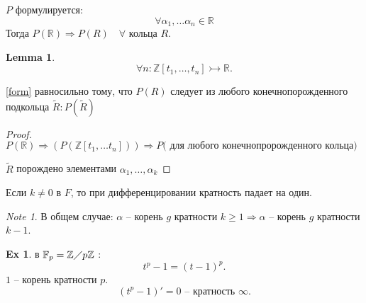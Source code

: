\documentclass[11pt]{book}
\newcommand{\Z}{\mathbb{Z}}
\newcommand{\R}{\mathbb{R}}
\theoremstyle{definition}
\theoremstyle{plain}
\theoremstyle{plain}
\newtheorem*{lm}{Lemma}
\theoremstyle{definition}
\newtheorem*{ex}{Ex}
\theoremstyle{remark}
\newtheorem*{note}{Note}
\begin{document}
$ P$ формулируется:
\begin{equation}\label{form}
\forall  \alpha _1, \ldots \alpha _n \in  \R
\end{equation}
Тогда $ P(\R) \Longrightarrow P(R) \quad \forall  \text{ кольца } R$.

\begin{lm}
    \[
	\forall n: \Z[t_1, \ldots , t_n] \rightarrowtail \R
    .\] 
\end{lm}
\begin{thm}
\ref{form} равносильно тому, что $ P(R)$ следует из любого конечнопорожденного подкольца $ \tilde R: P(\tilde R)$
\end{thm}
\begin{proof}
    $ P(\R) \Longrightarrow (P(\Z[t_1, \ldots t_n])) \Longrightarrow P( \text{ для любого конечнопророжденного кольца)}$

    $\tilde R $ порождено элементами $ \alpha _1, \ldots , \alpha _k $
\end{proof}
\begin{thm}
    Если $ k \ne 0 $ в $ F$, то при дифференцировании кратность падает на один.
\end{thm}
\begin{note}
    В общем случае: $ \alpha $ -- корень $ g$  кратности $ k \ge  1 \Longrightarrow  \alpha  $ -- корень $ g$ кратности  $ k-1$. 
\end{note}
\begin{ex}
    в $ {\mathbb F} _p = \Z \diagup p\Z$ :
\[
    t ^{p} -1= (t-1)^{p}
.\]  
$ 1$ -- корень кратности  $ p$. 
\[
    (t ^{p} - 1)' = 0 \text{ -- кратность } \infty
.\] 
\end{ex}
 
\end{document}
